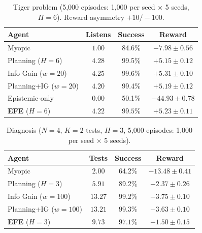 \documentclass[runningheads]{llncs}
\begin{document}
\begin{table}[h]
\centering
\caption{Tiger problem (5{,}000 episodes: 1{,}000 per seed $\times$ 5 seeds, $H{=}6$). Reward asymmetry $+10 / {-}100$.}
\begin{small}
\begin{tabular}{lccc}
\toprule
Agent & Listens & Success & Reward \\
\midrule
Myopic & $1.00$ & 84.6\% & $-7.98 \pm 0.56$ \\
Planning ($H{=}6$) & $4.28$ & 99.5\% & $+5.15 \pm 0.12$ \\
Info Gain ($w{=}20$) & $4.25$ & 99.6\% & $+5.31 \pm 0.10$ \\
Planning+IG ($w{=}20$) & $4.20$ & 99.4\% & $+5.19 \pm 0.12$ \\
Epistemic-only & $0.00$ & 50.1\% & $-44.93 \pm 0.78$ \\
\textbf{EFE} ($H{=}6$) & $\mathbf{4.22}$ & $\mathbf{99.5\%}$ & $\mathbf{+5.23 \pm 0.11}$ \\
\bottomrule
\end{tabular}
\end{small}
\end{table}

\begin{table}[h]
\centering
\caption{Diagnosis ($N{=}4$, $K{=}2$ tests, $H{=}3$, 5{,}000 episodes: 1{,}000 per seed $\times$ 5 seeds).}
\begin{small}
\begin{tabular}{lccc}
\toprule
Agent & Tests & Success & Reward \\
\midrule
Myopic & $2.00$ & 64.2\% & $-13.48 \pm 0.41$ \\
Planning ($H{=}3$) & $5.91$ & 89.2\% & $-2.37 \pm 0.26$ \\
Info Gain ($w{=}100$) & $13.27$ & 99.2\% & $-3.75 \pm 0.10$ \\
Planning+IG ($w{=}100$) & $13.21$ & 99.3\% & $-3.63 \pm 0.10$ \\
\textbf{EFE} ($H{=}3$) & $\mathbf{9.73}$ & $\mathbf{97.1\%}$ & $\mathbf{-1.50 \pm 0.15}$ \\
\bottomrule
\end{tabular}
\end{small}
\end{table}
\end{document}
